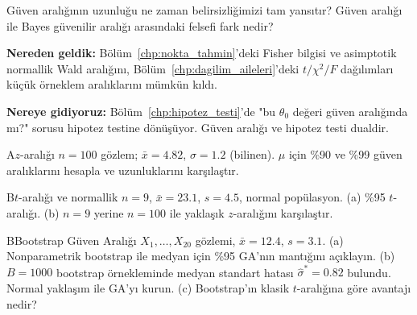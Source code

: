 \begin{ozyansima}
Güven aralığının uzunluğu ne zaman belirsizliğimizi tam yansıtır? Güven aralığı ile Bayes güvenilir aralığı arasındaki felsefi fark nedir?
\end{ozyansima}

\begin{kopru}
\textbf{Nereden geldik:} Bölüm~\ref{chp:nokta_tahmin}'deki Fisher bilgisi ve asimptotik normallik Wald aralığını, Bölüm~\ref{chp:dagilim_aileleri}'deki $t/\chi^2/F$ dağılımları küçük örneklem aralıklarını mümkün kıldı.

\textbf{Nereye gidiyoruz:} Bölüm~\ref{chp:hipotez_testi}'de "bu $\theta_0$ değeri güven aralığında mı?" sorusu hipotez testine dönüşüyor. Güven aralığı ve hipotez testi dualdir.
\end{kopru}


\cozumlualistirmalar

\begin{alistirma}[Al.13.1]{A}{$z$-aralığı}
$n=100$ gözlem; $\bar{x}=4.82$, $\sigma=1.2$ (bilinen). $\mu$ için \%90 ve \%99 güven aralıklarını hesapla ve uzunluklarını karşılaştır.
\end{alistirma}

\begin{alistirma}[Al.13.2]{B}{$t$-aralığı ve normallik}
$n=9$, $\bar{x}=23.1$, $s=4.5$, normal popülasyon. (a) \%95 $t$-aralığı. (b) $n=9$ yerine $n=100$ ile yaklaşık $z$-aralığını karşılaştır.
\end{alistirma}

\begin{alistirma}[Al.13.2b]{B}{Bootstrap Güven Aralığı}
$X_1,\ldots,X_{20}$ gözlemi, $\bar{x}=12.4$, $s=3.1$. (a) Nonparametrik bootstrap ile medyan için \%95 GA'nın mantığını açıklayın. (b) $B=1000$ bootstrap örnekleminde medyan standart hatası $\hat\sigma^*=0.82$ bulundu. Normal yaklaşım ile GA'yı kurun. (c) Bootstrap'ın klasik $t$-aralığına göre avantajı nedir?
\end{alistirma}

